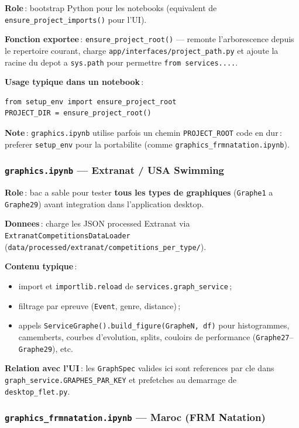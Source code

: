\documentclass[11pt,a4paper]{article}
\begin{document}
\textbf{Role}\,: bootstrap Python pour les notebooks (equivalent de \texttt{ensure\_project\_imports()} pour l'UI).

\textbf{Fonction exportee}\,: \texttt{ensure\_project\_root()} --- remonte l'arborescence depuis le repertoire courant, charge \texttt{app/interfaces/project\_path.py} et ajoute la racine du depot a \texttt{sys.path} pour permettre \texttt{from services....}.

\textbf{Usage typique dans un notebook}\,:
\begin{lstlisting}
from setup_env import ensure_project_root
PROJECT_DIR = ensure_project_root()
\end{lstlisting}

\textbf{Note}\,: \texttt{graphics.ipynb} utilise parfois un chemin \texttt{PROJECT\_ROOT} code en dur\,: preferer \texttt{setup\_env} pour la portabilite (comme \texttt{graphics\_frmnatation.ipynb}).

\subsubsection{\texttt{graphics.ipynb} --- Extranat / USA Swimming}

\textbf{Role}\,: bac a sable pour tester \textbf{tous les types de graphiques} (\texttt{Graphe1} a \texttt{Graphe29}) avant integration dans l'application desktop.

\textbf{Donnees}\,: charge les JSON processed Extranat via \texttt{ExtranatCompetitionsDataLoader} (\texttt{data/processed/extranat/competitions\_per\_type/}).

\textbf{Contenu typique}\,:
\begin{itemize}
  \item import et \texttt{importlib.reload} de \texttt{services.graph\_service}\,;
  \item filtrage par epreuve (\texttt{Event}, genre, distance)\,;
  \item appels \texttt{ServiceGraphe().build\_figure(GrapheN, df)} pour histogrammes, camemberts, courbes d'evolution, splits, couloirs de performance (\texttt{Graphe27}--\texttt{Graphe29}), etc.
\end{itemize}

\textbf{Relation avec l'UI}\,: les \texttt{GraphSpec} valides ici sont references par cle dans \texttt{graph\_service.GRAPHES\_PAR\_KEY} et prefetches au demarrage de \texttt{desktop\_flet.py}.

\subsubsection{\texttt{graphics\_frmnatation.ipynb} --- Maroc (FRM Natation)}
\end{document}
